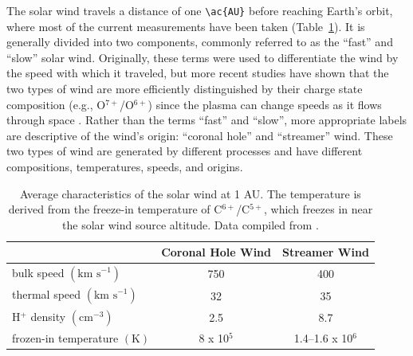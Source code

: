 The solar wind travels a distance of one \verb!\ac{AU}! before reaching Earth's orbit, where most of the current measurements have been taken (Table~\ref{tab:solar wind}). It is generally divided into two components, commonly referred to as the ``fast'' and ``slow'' solar wind. Originally, these terms were used to differentiate the wind by the speed with which it traveled, but more recent studies have shown that the two types of wind are more efficiently distinguished by their charge state composition (e.g., O$^{7+}$/O$^{6+}$) since the plasma can change speeds as it flows through space \citep{geiss95b, gloeckler03a}. Rather than the terms ``fast'' and ``slow'', more appropriate labels are descriptive of the wind's origin: ``coronal hole'' and ``streamer'' wind. These two types of wind are generated by different processes and have different compositions, temperatures, speeds, and origins.
\begin{table}[htbp]
	\centering
		\begin{tabular}{l|c|c}
		                                                               & Coronal Hole Wind & Streamer Wind     \\ \hline
      bulk speed \footnotesize{$\left(\text{km s}^{-1}\right)$}    & 750               & 400               \\ \hline
      thermal speed \footnotesize{$\left(\text{km s}^{-1}\right)$} & 32                & 35                \\ \hline
      H$^+$ density \footnotesize{$\left(\text{cm}^{-3}\right)$}   & 2.5               & 8.7               \\ \hline
      frozen-in temperature \footnotesize{$\left(\text{K}\right)$} & 8 x 10$^5$        & 1.4--1.6 x 10$^6$ \\ \hline

		\end{tabular}
	\caption[Average characteristics of the solar wind at 1 AU.]{Average characteristics of the solar wind at 1 AU. The temperature is derived from the freeze-in temperature of C$^{6+}$/C$^{5+}$, which freezes in near the solar wind source altitude. Data compiled from \citet{vonsteiger95, gloeckler98a, ipavich98, mccomas00, feldman05}.}
	\label{tab:solar wind}
\end{table}

